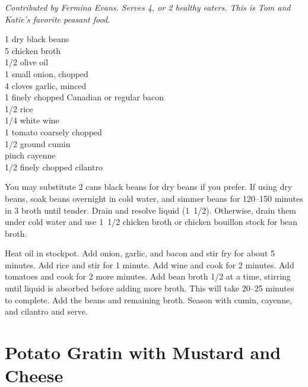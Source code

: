 \textit{Contributed by Fermina Evans. Serves 4, or 2 healthy eaters. This is
Tom and Katie's favorite peasant food.}
\begin{ingredients}
  \SI{1}{\cup} dry black beans\\
  \SI{5}{\cup} chicken broth\\
  \SI{1/2}{\tblspoon} olive oil \\
  1 small onion, chopped \\
  4 cloves garlic, minced \\
  \SI{1}{\ounce} finely chopped Canadian or regular bacon \\
  \SI{1/2}{\cup} rice \\
  \SI{1/4}{\cup} white wine \\
  1 tomato coarsely chopped \\
  \SI{1/2}{\teaspoon} ground cumin \\
  pinch cayenne \\
  \SI{1/2}{\cup} finely chopped cilantro
\end{ingredients}
You may substitute 2 cans black beans for dry beans if you prefer. If using
dry beans, soak beans overnight in cold water, and simmer beans for
\numrange{120}{150} minutes in \SI{3}{\cup} broth until tender. Drain and
resolve liquid (\SI{1/2}[1]{\cup}). Otherwise, drain them under cold water and
use \SI{1/2}[1]{\cup} chicken broth or chicken bouillon stock for bean broth.

Heat oil in stockpot. Add onion, garlic, and bacon and stir fry for about 5
minutes.  Add rice and stir for 1 minute. Add wine and cook for 2 minutes. Add
tomatoes and cook for 2 more minutes.  Add bean broth \SI{1/2}{\cup} at a
time, stirring until liquid is absorbed before adding more broth. This will
take \numrange{20}{25} minutes to complete. Add the beans and remaining
broth. Season with cumin, cayenne, and cilantro and serve.

\section{Potato Gratin with Mustard and Cheese}

